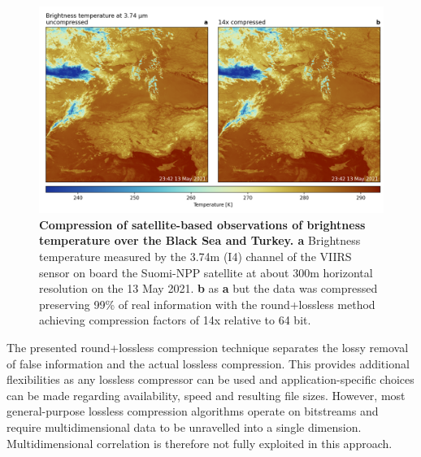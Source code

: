\begin{figure}[tbhp]
	\includegraphics[width=1\textwidth]{Figures/compression/brightness_temp.png}
	\caption{\textbf{Compression of satellite-based observations of brightness temperature over the
	Black Sea and Turkey. a} Brightness temperature measured by the 3.74\textmu m (I4) channel of
	the VIIRS sensor on board the Suomi-NPP satellite at about 300m horizontal resolution on
	the 13 May 2021. \textbf{b} as \textbf{a} but the data was compressed preserving 99\% of
	real information with the round+lossless method achieving compression factors of 14x
	relative to 64 bit.}
	\label{fig:brightness_temp}
\end{figure}

The presented round+lossless compression technique separates the lossy removal of false information and the actual lossless
compression. This provides additional flexibilities as any lossless compressor can be used and application-specific choices can
be made regarding availability, speed and resulting file sizes. However, most general-purpose lossless compression algorithms
operate on bitstreams and require multidimensional data to be unravelled into a single dimension. Multidimensional correlation
is therefore not fully exploited in this approach.

